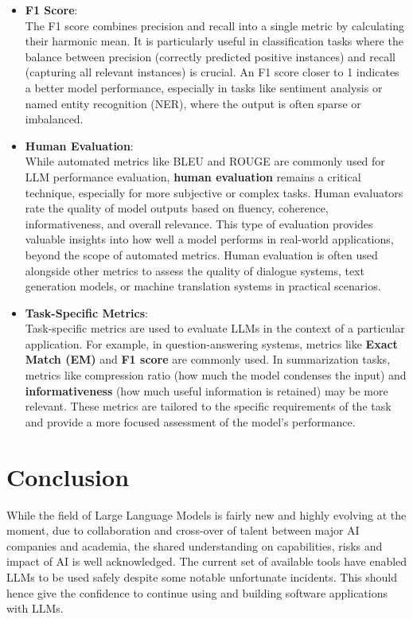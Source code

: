 \documentclass[12pt]{article}
\newcommand{\tab}{\hspace*{2em}} %
\begin{document}
\begin{itemize}
        \item \textbf{F1 Score}: \\
        The F1 score combines precision and recall into a single metric by calculating their harmonic mean. It is particularly useful in classification tasks where the balance between precision (correctly predicted positive instances) and recall (capturing all relevant instances) is crucial. An F1 score closer to 1 indicates a better model performance, especially in tasks like sentiment analysis or named entity recognition (NER), where the output is often sparse or imbalanced.

        \item \textbf{Human Evaluation}: \\
        While automated metrics like BLEU and ROUGE are commonly used for LLM performance evaluation, \textbf{human evaluation} remains a critical technique, especially for more subjective or complex tasks. Human evaluators rate the quality of model outputs based on fluency, coherence, informativeness, and overall relevance. This type of evaluation provides valuable insights into how well a model performs in real-world applications, beyond the scope of automated metrics. Human evaluation is often used alongside other metrics to assess the quality of dialogue systems, text generation models, or machine translation systems in practical scenarios.

        \item \textbf{Task-Specific Metrics}: \\
        Task-specific metrics are used to evaluate LLMs in the context of a particular application. For example, in question-answering systems, metrics like \textbf{Exact Match (EM)} and \textbf{F1 score} are commonly used. In summarization tasks, metrics like compression ratio (how much the model condenses the input) and \textbf{informativeness} (how much useful information is retained) may be more relevant. These metrics are tailored to the specific requirements of the task and provide a more focused assessment of the model’s performance.
    \end{itemize}


    \section{Conclusion}
    \tab While the field of Large Language Models is fairly new and highly evolving at the moment, due to collaboration and cross-over of talent between major AI companies and academia, the shared understanding on capabilities, risks and impact of AI is well acknowledged.
    The current set of available tools have enabled LLMs to be used safely despite some notable unfortunate incidents. This should hence give the confidence to continue using and building software applications with LLMs.
\end{document}
